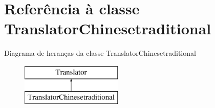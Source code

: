 \hypertarget{class_translator_chinesetraditional}{\section{Referência à classe Translator\-Chinesetraditional}
\label{class_translator_chinesetraditional}
}
Diagrama de heranças da classe Translator\-Chinesetraditional\begin{figure}[H]
\begin{center}
\leavevmode
\includegraphics[height=2.000000cm]{class_translator_chinesetraditional}
\end{center}
\end{figure}
